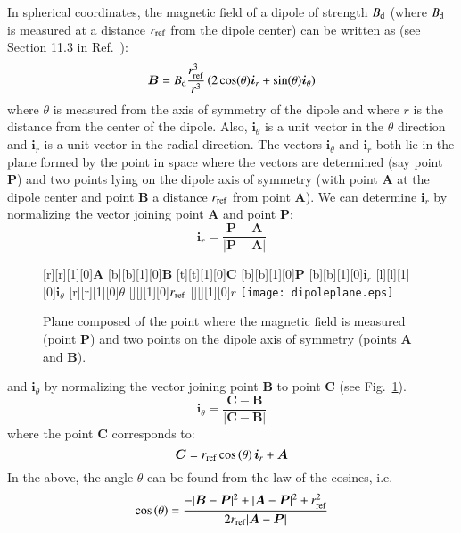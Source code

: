 \documentclass{warpdoc}
\newlength\lengthfigure                  %
\renewcommand{\fontsizefigure}{\footnotesize}
\newcommand{\Bdipole}{B_{\rm d}}
\renewcommand{\vec}[1]{\bm{#1}}
\begin{document}
In spherical coordinates,
the magnetic field of a dipole of strength $\Bdipole$ (where $\Bdipole$ is measured
at a distance $r_{\rm ref}$ from the dipole center) can be written as
(see Section 11.3 in Ref.\ \cite{book:1985:purcell}):
%
\begin{equation}
  \vec{B}=\Bdipole\frac{r_{\rm ref}^3}{r^3} \left( 2 \cos (\theta) \vec{i}_r +\sin (\theta) \vec{i}_\theta  \right)
\end{equation}
%
where $\theta$ is measured from the axis of symmetry of the dipole and where $r$ is the distance
from the center of the dipole. Also, $\vec{i}_\theta$ is a unit vector in the $\theta$
direction and $\vec{i}_r$ is a unit vector in the radial direction. The vectors
$\vec{i}_\theta$ and $\vec{i}_r$ both lie in the plane formed by the point in space
where the vectors are determined (say point {$\vec{P}$}) and two points lying on
the dipole axis of symmetry (with point {$\vec{A}$} at the dipole center and point {$\vec{B}$}
a distance $r_{\rm ref}$ from point {$\vec{A}$}). We can determine $\vec{i}_r$ by normalizing
the vector joining point {$\vec{A}$} and point {$\vec{P}$}:
%
\begin{equation}
\vec{i}_r=\frac{\vec{P}-\vec{A}}{|\vec{P}-\vec{A}|}
\end{equation}
%
\begin{figure}
   \fontsizefigure\center
   [r][r][1][0]{${\vec{A}}$}
   [b][b][1][0]{${\vec{B}}$}
   [t][t][1][0]{${\vec{C}}$}
   [b][b][1][0]{${\vec{P}}$}
   [b][b][1][0]{$\vec{i}_r$}
   [l][l][1][0]{$\vec{i}_\theta$}
   [r][r][1][0]{$\theta$}
   [][][1][0]{$r_{\rm ref}$}
   [][][1][0]{$r$}
   \texttt{[image: dipoleplane.eps]}
\caption{Plane composed of the point where the magnetic field is measured (point ${\vec{P}}$)
         and two points on the dipole axis of symmetry (points $\vec{{A}}$ and ${\vec{B}}$).}
\label{fig:dipoleplane}
\end{figure}
%
and $\vec{i}_\theta$ by normalizing
the vector joining point {$\vec{B}$} to point {$\vec{C}$} (see Fig.\ \ref{fig:dipoleplane}).
%
\begin{equation}
\vec{i}_\theta=\frac{\vec{C}-\vec{B}}{|\vec{C}-\vec{B}|}
\end{equation}
%
where the point $\vec{C}$ corresponds to:
%
\begin{equation}
\vec{C}=r_{\rm ref} \cos \left( \theta \right) \vec{i}_r + \vec{A}
\end{equation}
%
In the above, the angle $\theta$ can be found from the law of the cosines, i.e.
%
\begin{equation}
     \cos \left( \theta \right)=
       \frac{-|\vec{B}-\vec{P}|^2 + |\vec{A}-\vec{P}|^2 + r_{\rm ref}^2}{2 r_{\rm ref}|\vec{A}-\vec{P}|}
\end{equation}
%
\end{document}
